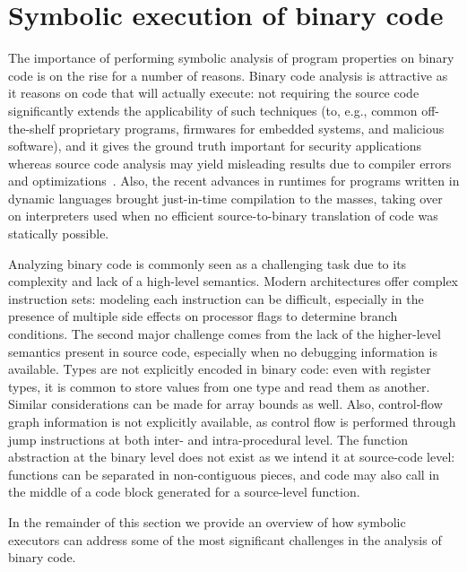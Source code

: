 
\section{Symbolic execution of binary code}
\label{se:symbolic-binary}

The importance of performing symbolic analysis of program properties on binary code is on the rise for a number of reasons. Binary code analysis is attractive as it reasons on code that will actually execute: not requiring the source code significantly extends the applicability of such techniques (to, e.g., common off-the-shelf proprietary programs, firmwares for embedded systems, and malicious software), and it gives the ground truth important for security applications whereas source code analysis may yield misleading results due to compiler errors and optimizations~\cite{BITBLAZE-ICISS08}. Also, the recent advances in runtimes for programs written in dynamic languages brought just-in-time compilation to the masses, taking over on interpreters used when no efficient source-to-binary translation of code was statically possible. 

Analyzing binary code is commonly seen as a challenging task due to its complexity and lack of a high-level semantics. Modern architectures offer complex instruction sets: modeling each instruction can be difficult, especially in the presence of multiple side effects on processor flags to determine branch conditions. The second major challenge comes from the lack of the higher-level semantics present in source code, especially when no debugging information is available. Types are not explicitly encoded in binary code: even with register types, it is common to store values from one type and read them as another. Similar considerations can be made for array bounds as well. Also, control-flow graph information is not explicitly available, as control flow is performed through jump instructions at both inter- and intra-procedural level. The function abstraction at the binary level does not exist as we intend it at source-code level: functions can be separated in non-contiguous pieces, and code may also call in the middle of a code block generated for a source-level function.

In the remainder of this section we provide an overview of how symbolic executors can address some of the most significant challenges in the analysis of binary code.

